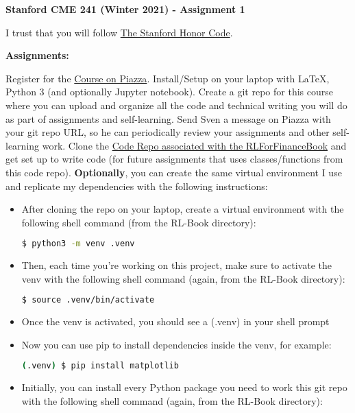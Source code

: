 \documentclass[12pt]{exam}
\begin{document}
\begin{center}
{\large {\bf Stanford CME 241 (Winter 2021) - Assignment 1}}
\end{center}

I trust that you will follow \href{https://communitystandards.stanford.edu/policies-and-guidance/honor-code}{The Stanford Honor Code}.
 
{\large{\bf Assignments:}}
\begin{questions}
\question Register for the \href{https://piazza.com/stanford/winter2021/cme241/home}{Course on Piazza}.
\question Install/Setup on your laptop with LaTeX, Python 3 (and optionally Jupyter notebook).
\question Create a git repo for this course where you can upload and organize all the code and technical writing you will do as part of assignments and self-learning.
\question Send Sven a message on Piazza with your git repo URL, so he can periodically review your assignments and other self-learning work.
\question Clone the \href{https://github.com/TikhonJelvis/RL-book}{Code Repo associated with the RLForFinanceBook} and get set up to write code (for future assignments that uses classes/functions from this code repo). {\bf Optionally}, you can create the same virtual environment I use and replicate my dependencies with the following instructions:
\begin{itemize}
\item After cloning the repo on your laptop, create a virtual environment with the following shell command (from the RL-Book directory):
\begin{lstlisting}[language=bash]
$ python3 -m venv .venv
\end{lstlisting}
\item Then, each time you're working on this project, make sure to activate the venv with the following shell command (again, from the RL-Book directory):
\begin{lstlisting}[language=bash]
$ source .venv/bin/activate
\end{lstlisting}
\item Once the venv is activated, you should see a (.venv) in your shell prompt
\item Now you can use pip to install dependencies inside the venv, for example:
\begin{lstlisting}[language=bash]
(.venv) $ pip install matplotlib
\end{lstlisting}
\item Initially, you can install every Python package you need to work this git repo with the following shell command (again, from the RL-Book directory):

\end{itemize}
\end{questions}
\end{document}
